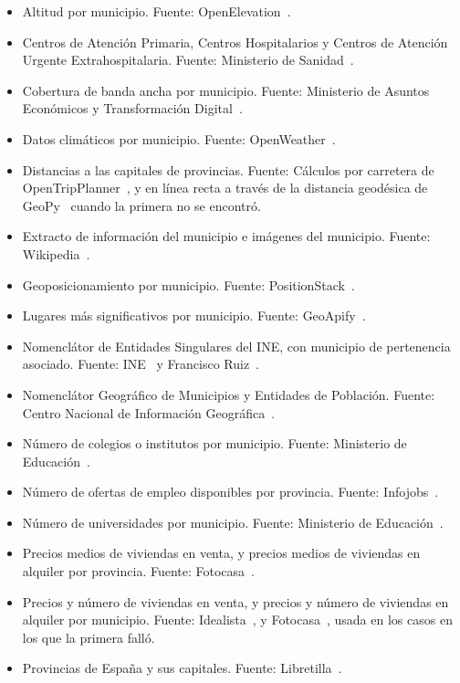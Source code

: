 \begin{itemize}
    \item Altitud por municipio. Fuente: OpenElevation~\cite{openelevation}.
    \item Centros de Atención Primaria, Centros Hospitalarios y Centros de Atención Urgente Extrahospitalaria. Fuente: Ministerio de Sanidad~\cite{salud}.
    \item Cobertura de banda ancha por municipio. Fuente: Ministerio de Asuntos Económicos y Transformación Digital~\cite{cobertura}.
    \item Datos climáticos por municipio. Fuente: OpenWeather~\cite{openweather}.
    \item Distancias a las capitales de provincias. Fuente: Cálculos por carretera de OpenTripPlanner~\cite{otp}, y en línea recta a través de la distancia geodésica de GeoPy~\cite{GeoPy} cuando la primera no se encontró.
    \item Extracto de información del municipio e imágenes del municipio. Fuente: Wikipedia~\cite{wikipedia_api}.
    \item Geoposicionamiento por municipio. Fuente: PositionStack~\cite{positionstack}.
    \item Lugares más significativos por municipio. Fuente: GeoApify~\cite{geoapify}.
    \item Nomenclátor de Entidades Singulares del INE, con municipio de pertenencia asociado. Fuente: INE~\cite{municipios_ine} y Francisco Ruiz~\cite{entidades}.
    \item Nomenclátor Geográfico de Municipios y Entidades de Población. Fuente: Centro Nacional de Información Geográfica~\cite{nomenclator}.
    \item Número de colegios o institutos por municipio. Fuente: Ministerio de Educación~\cite{colegios}.
    \item Número de ofertas de empleo disponibles por provincia. Fuente: Infojobs~\cite{infojobs}.
    \item Número de universidades por municipio. Fuente: Ministerio de Educación~\cite{universidades}.
    \item Precios medios de viviendas en venta, y precios medios de viviendas en alquiler por provincia. Fuente: Fotocasa~\cite{fotocasa}.
    \item Precios y número de viviendas en venta, y precios y número de viviendas en alquiler por municipio. Fuente: Idealista~\cite{idealista}, y Fotocasa~\cite{fotocasa}, usada en los casos en los que la primera falló.
    \item Provincias de España y sus capitales. Fuente: Libretilla~\cite{provincias}.

\end{itemize}
